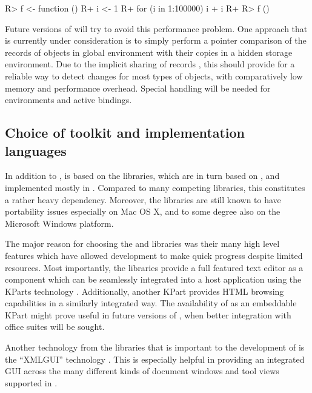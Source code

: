 \begin{Code}
R> f <- function () {
R+    i <- 1
R+    for (i in 1:100000) i + i
R+ }
R> f ()
\end{Code}

Future versions of  will try to avoid this performance problem. 
One approach that is currently under consideration is to simply perform
a pointer comparison of the  records of objects in global environment with
their copies in a hidden storage environment. Due to the implicit sharing of
 records \citep{RDCT2010a, RDCT2010b}, this should provide for a reliable
way to detect changes for most types of  objects, with comparatively low memory
and performance overhead. Special handling will be needed for environments and
active bindings.

\subsection{Choice of toolkit and implementation languages}
\label{sec:technical_toolkit}
In addition to ,  is based on the  libraries, which are in turn based
on , and implemented mostly in . Compared to many competing libraries,
this constitutes a rather heavy dependency. Moreover, the  libraries are
still known to have portability issues especially on Mac OS X, and to some degree
also on the Microsoft Windows platform.

The major reason for choosing the  and  libraries was their 
many high level features which have allowed  development to make quick
progress despite limited resources. Most importantly, the  libraries provide a
full featured text editor \citep{CullmannND} as a component which can be
seamlessly integrated into a host application using the KParts technology
\citep{Faure2000}. Additionally, another KPart provides HTML browsing capabilities in a
similarly integrated way. The availability of  \citep{KWord} as an
embeddable KPart might prove useful in future versions of , when better
integration with office suites will be sought.

Another technology from the  libraries that is important to the development
of  is the ``XMLGUI'' technology
\citep{Faure2000}. This is especially helpful in providing an integrated GUI across
the many different kinds of document windows and tool views supported in .

